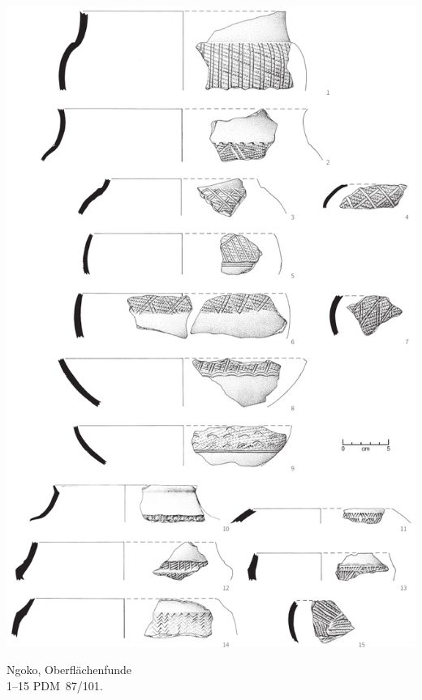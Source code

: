 \begin{pl}[H]
	\includegraphics{plt/Taf64.pdf}
	\vspace{.75em}\caption{\mbox{Ngoko}, Oberflächenfunde \\ 1--15 PDM~87/101.}
	\label{pl:64}
\end{pl}

